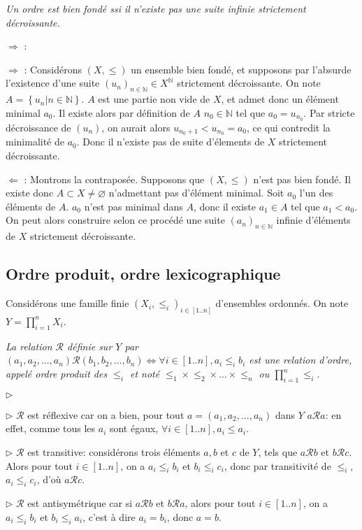\documentclass{scrartcl}
\begin{document}
			\prop \textsl{Un ordre est bien fondé ssi il n'existe pas une suite infinie strictement décroissante.}
			\begin{labeling}{$\Rightarrow$ :}
				\item [$\Rightarrow$ :] Considérons $(X,\leq)$ un ensemble bien fondé,
				et supposons par l'absurde l'existence d'une suite $(u_n)_{n\in\mathbb{N}}\in X^\mathbb{N}$ strictement décroissante.
				On note $A = \left\{u_n \big| n \in \mathbb{N}\right\}$.
				$A$ est une partie non vide de $X$, et admet donc un élément minimal $a_0$.
				Il existe alors par définition de $A$ $n_0\in\mathbb{N}$ tel que $a_0 = u_{n_0}$.
				Par stricte décroissance de $(u_n)$, on aurait alors  $u_{n_0+1} < u_{n_0} = a_0$, 
				ce qui contredit la minimalité de $a_0$. 
				Donc il n'existe pas de suite d'élements de $X$ strictement décroissante.
				\item [$\Leftarrow$ :] Montrons la contraposée. 
				Supposons que $(X,\leq)$ n'est pas bien fondé. 
				Il existe donc $A\subset X \neq \varnothing$ n'admettant pas d'élément minimal.
				Soit $a_0$ l'un des éléments de $A$. 
				$a_0$ n'est pas minimal dans $A$, donc il existe $a_1 \in A$ tel que $a_1 < a_0$.
				On peut alors construire selon ce procédé une suite $(a_n)_{n\in\mathbb{N}}$ infinie
				d'éléments de $X$ strictement décroissante.
			\end{labeling}
		\subsection{Ordre produit, ordre lexicographique}
			Considérons une famille finie $(X_i,\leq_i)_{i\in [1..n]}$ d'ensembles ordonnés.
			On note $Y = \prod_{i=1}^n X_i$.
			
			\prop \textsl{La relation $\mathcal{R}$ définie sur $Y$ par 
				$(a_1,a_2,...,a_n)\mathcal{R}(b_1,b_2,...,b_n) \Leftrightarrow \forall i \in [1..n], a_i\leq_i b_i$
				est une relation d'ordre, appelé ordre produit des $\leq_i$ et 
				noté $\leq_1\times\leq_2\times...\times\leq_n$ ou $\prod_{i=1}^n\leq_i$.}
			\begin{labeling}{$\triangleright$}
				\item [$\triangleright$] $\mathcal{R}$ est réflexive car on a bien, pour tout $a = (a_1,a_2,...,a_n)$ dans $Y$
					$a\mathcal{R}a$: en effet, comme tous les $a_i$ sont égaux, $\forall i \in [1..n], a_i \leq a_i$.
				\item [$\triangleright$] $\mathcal{R}$ est transitive: considérons trois éléments $a,b$ et $c$ de $Y$,
					tels que $a\mathcal{R}b$ et $b\mathcal{R}c$. Alors pour tout $i \in [1..n]$, on a $a_i\leq_i b_i$
					et $b_i \leq_i c_i$, donc par transitivité de $\leq_i$, $a_i\leq_i c_i$, d'où $a\mathcal{R}c$.
				\item [$\triangleright$] $\mathcal{R}$ est antisymétrique car si $a\mathcal{R}b$ et $b\mathcal{R}a$,
					alors pour tout $i\in [1..n]$, on a $a_i \leq_i b_i$ et $b_i\leq_i a_i$, c'est à dire
					$a_i = b_i$, donc $a=b$.
			\end{labeling}
\end{document}
